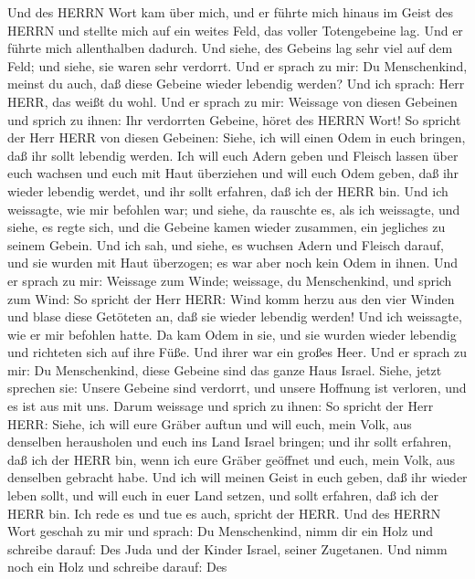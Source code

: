  Und des HERRN Wort kam über mich, und er führte mich hinaus
im Geist des HERRN und stellte mich auf ein weites Feld, das voller
Totengebeine lag.  Und er führte mich allenthalben dadurch.
Und siehe, des Gebeins lag sehr viel auf dem Feld; und siehe, sie waren
sehr verdorrt.  Und er sprach zu mir: Du Menschenkind,
meinst du auch, daß diese Gebeine wieder lebendig werden? Und ich
sprach: Herr HERR, das weißt du wohl.  Und er sprach zu mir:
Weissage von diesen Gebeinen und sprich zu ihnen: Ihr verdorrten
Gebeine, höret des HERRN Wort!  So spricht der Herr HERR von
diesen Gebeinen: Siehe, ich will einen Odem in euch bringen, daß ihr
sollt lebendig werden.  Ich will euch Adern geben und
Fleisch lassen über euch wachsen und euch mit Haut überziehen und will
euch Odem geben, daß ihr wieder lebendig werdet, und ihr sollt erfahren,
daß ich der HERR bin.  Und ich weissagte, wie mir befohlen
war; und siehe, da rauschte es, als ich weissagte, und siehe, es regte
sich, und die Gebeine kamen wieder zusammen, ein jegliches zu seinem
Gebein.  Und ich sah, und siehe, es wuchsen Adern und
Fleisch darauf, und sie wurden mit Haut überzogen; es war aber noch kein
Odem in ihnen.  Und er sprach zu mir: Weissage zum Winde;
weissage, du Menschenkind, und sprich zum Wind: So spricht der Herr
HERR: Wind komm herzu aus den vier Winden und blase diese Getöteten an,
daß sie wieder lebendig werden!  Und ich weissagte, wie er
mir befohlen hatte. Da kam Odem in sie, und sie wurden wieder lebendig
und richteten sich auf ihre Füße. Und ihrer war ein großes Heer.
 Und er sprach zu mir: Du Menschenkind, diese Gebeine sind
das ganze Haus Israel. Siehe, jetzt sprechen sie: Unsere Gebeine sind
verdorrt, und unsere Hoffnung ist verloren, und es ist aus mit uns.
 Darum weissage und sprich zu ihnen: So spricht der Herr
HERR: Siehe, ich will eure Gräber auftun und will euch, mein Volk, aus
denselben herausholen und euch ins Land Israel bringen; 
und ihr sollt erfahren, daß ich der HERR bin, wenn ich eure Gräber
geöffnet und euch, mein Volk, aus denselben gebracht habe. 
Und ich will meinen Geist in euch geben, daß ihr wieder leben sollt, und
will euch in euer Land setzen, und sollt erfahren, daß ich der HERR bin.
Ich rede es und tue es auch, spricht der HERR.  Und des
HERRN Wort geschah zu mir und sprach:  Du Menschenkind,
nimm dir ein Holz und schreibe darauf: Des Juda und der Kinder Israel,
seiner Zugetanen. Und nimm noch ein Holz und schreibe darauf: Des
